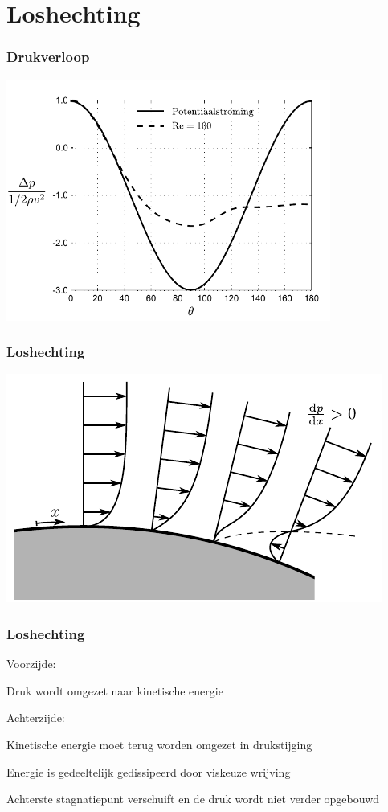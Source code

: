 \documentclass[t]{beamer}
\begin{document}
	\section{Loshechting}
	\begin{frame}
		\frametitle{Drukverloop}
		\pause
		\center
		\includegraphics[width=0.8\textwidth]{fig/uitwendige_stroming/Cilinderstroming_drukverloop}
  	\end{frame}
  	\begin{frame}
		\frametitle{Loshechting}
		\pause
		\center
		\includegraphics{fig/uitwendige_stroming/loshechting}
  	\end{frame}
  	\begin{frame}
		\frametitle{Loshechting}
		Voorzijde:
		\begin{center}
			Druk wordt omgezet naar kinetische energie
		\end{center}
		
		\vspace{0.5cm}
		\pause
		Achterzijde:
		\begin{center}
			Kinetische energie moet terug worden omgezet in drukstijging
			
			\vspace{0.5cm}
			\pause
			Energie is gedeeltelijk gedissipeerd door viskeuze wrijving
			
			\vspace{0.5cm}
			\pause
			Achterste stagnatiepunt verschuift en de druk wordt niet verder opgebouwd
		\end{center}
  	\end{frame}
\end{document}

